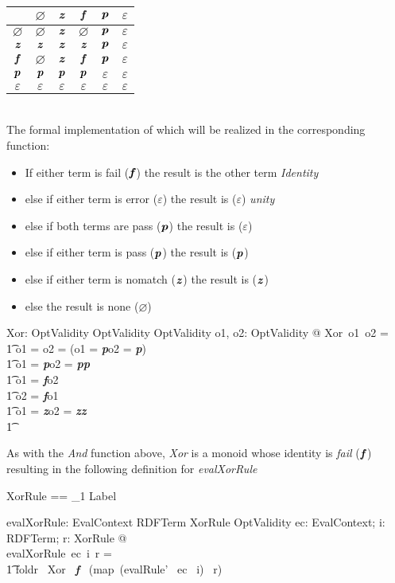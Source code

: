 \documentclass[fuzz]{llncs}
\def\pass{\textbf{\textit{p}}}
\def\fail{\textbf{\textit{f}}}
\def\none{\varnothing}
\def\error{\varepsilon}
\def\nomatch{\textbf{\textit{z}}}
\def\zc{\textit}
\def\zcb{\textit{\textbf}}
\begin{document}
\begin{tabular}{c || c | c | c | c | c |}
   \hline
   \zcb{Xor} & $\none$ & $\nomatch$ & $\fail$ & $\pass$ & $\error$ \\
   \hline \hline
   $\none$ & $\none$ & $\nomatch$ & $\none$ & $\pass$ & $\error$ \\ \hline
   $\nomatch$ & $\nomatch$ & $\nomatch$ & $\nomatch$ & $\pass$ & $\error$ \\ \hline
   $\fail$ & $\none$ & $\nomatch$ & $\fail$ & $\pass$ & $\error$ \\ \hline
   $\pass$ & $\pass$ & $\pass$ & $\pass$ & $\error$ & $\error$ \\ \hline
   $\error$ & $\error$ & $\error$ & $\error$ & $\error$ & $\error$ \\ \hline 
\end{tabular}
\\
The formal implementation of which will be realized in the corresponding function:
\begin{itemize}
\item If either term is fail ($\fail$) the result is the other term  \textit{Identity}
\item else if either term is error ($\error$) the result is ($\error$) \textit{unity}
\item else if both terms are pass ($\pass$) the result is ($\error$) 
\item else if either term is pass ($\pass$) the result is ($\pass$)
\item else if either term is nomatch ($\nomatch$) the result is ($\nomatch$)
\item else the result is none ($\none$)
\end{itemize}
\begin{axdef}
   Xor: OptValidity \fun OptValidity \fun OptValidity
\where
   \forall o1, o2: OptValidity @ Xor~o1~o2 = \\
\t1 \IF o1 = \error \lor o2 = \error \lor (o1 = \pass \land o2 = \pass) \THEN \error \\
\t1 \ELSE \IF o1 = \pass \lor o2 = \pass \THEN \pass \\
\t1 \ELSE \IF o1 = \fail \THEN o2 \\
\t1 \ELSE \IF o2 = \fail \THEN o1 \\
\t1 \ELSE \IF o1 = \nomatch \lor o2 = \nomatch \THEN \nomatch \\
\t1 \ELSE \none
\end{axdef}
As with the \zc{And} function above, \zc{Xor} is a monoid whose identity is \zc{fail} ($\fail$)
resulting in the following definition for \zc{evalXorRule}
\begin{zed}
XorRule == \seq_1 Label
\end{zed}
\begin{axdef}
   evalXorRule: EvalContext \fun RDFTerm \fun XorRule \fun OptValidity
\where
   \forall ec: EvalContext; i: RDFTerm; r: XorRule  @ \\
	evalXorRule~ec~i~r = \\
\t1	foldr~ Xor~ \fail ~ (map~(evalRule'~ ec ~i)~ r)
\end{axdef}
\end{document}
